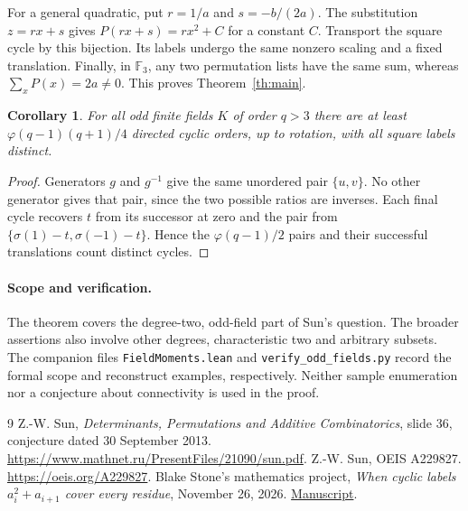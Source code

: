\documentclass[11pt]{article}
\newtheorem{corollary}[theorem]{Corollary}
\newcommand{\F}{\mathbb F}
\begin{document}
For a general quadratic, put $r=1/a$ and $s=-b/(2a)$. The substitution $z=rx+s$ gives $P(rx+s)=rx^2+C$ for a constant $C$. Transport the square cycle by this bijection. Its labels undergo the same nonzero scaling and a fixed translation. Finally, in $\F_3$, any two permutation lists have the same sum, whereas $\sum_x P(x)=2a\ne0$. This proves Theorem~\ref{th:main}.

\begin{corollary}
For all odd finite fields $K$ of order $q>3$ there are at least
$\varphi(q-1)(q+1)/4$ directed cyclic orders, up to rotation, with all square labels distinct.
\end{corollary}
\begin{proof}
Generators $g$ and $g^{-1}$ give the same unordered pair $\{u,v\}$. No other generator gives that pair, since the two possible ratios are inverses. Each final cycle recovers $t$ from its successor at zero and the pair from $\{\sigma(1)-t,\sigma(-1)-t\}$. Hence the $\varphi(q-1)/2$ pairs and their successful translations count distinct cycles.
\end{proof}

\paragraph{Scope and verification.} The theorem covers the degree-two, odd-field part of Sun's question. The broader assertions also involve other degrees, characteristic two and arbitrary subsets. The companion files \texttt{FieldMoments.lean} and \texttt{verify\_odd\_fields.py} record the formal scope and reconstruct examples, respectively. Neither sample enumeration nor a conjecture about connectivity is used in the proof.

\begin{thebibliography}{9}
 Z.-W. Sun, \emph{Determinants, Permutations and Additive Combinatorics}, slide 36, conjecture dated 30 September 2013. \url{https://www.mathnet.ru/PresentFiles/21090/sun.pdf}.
 Z.-W. Sun, OEIS A229827. \url{https://oeis.org/A229827}.
 Blake Stone's mathematics project, \emph{When cyclic labels $a_i^2+a_{i+1}$ cover every residue}, November 26, 2026. \href{https://github.com/blakestone-x/math/blob/33768157ccaf033ea0fa5578ea061ed272e8fb20/Sun-polynomial-cycles/square-circle.pdf}{Manuscript}.
\end{thebibliography}
\end{document}
